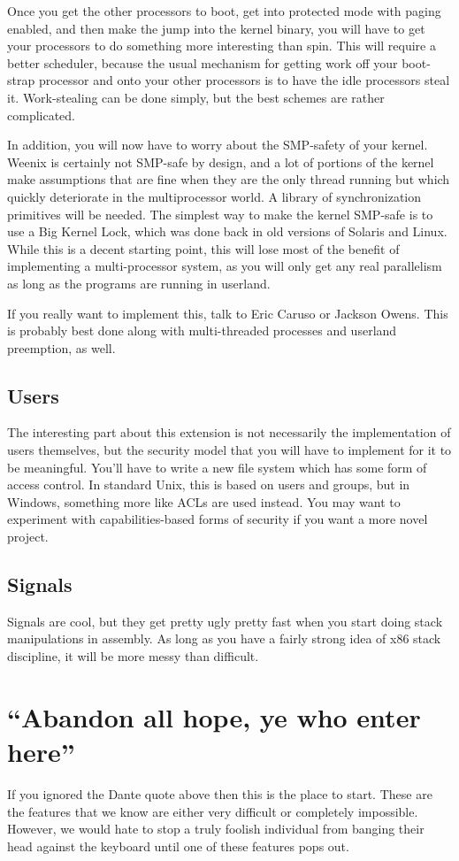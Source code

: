 Once you get the other processors to boot, get into protected mode with paging enabled, and then make the jump into the kernel binary, you will have to get your processors to do something more interesting than spin. This will require a better scheduler, because the usual mechanism for getting work off your boot-strap processor and onto your other processors is to have the idle processors steal it. Work-stealing can be done simply, but the best schemes are rather complicated.

In addition, you will now have to worry about the SMP-safety of your kernel. Weenix is certainly not SMP-safe by design, and a lot of portions of the kernel make assumptions that are fine when they are the only thread running but which quickly deteriorate in the multiprocessor world. A library of synchronization primitives will be needed. The simplest way to make the kernel SMP-safe is to use a Big Kernel Lock, which was done back in old versions of Solaris and Linux. While this is a decent starting point, this will lose most of the benefit of implementing a multi-processor system, as you will only get any real parallelism as long as the programs are running in userland.

If you really want to implement this, talk to Eric Caruso or Jackson Owens. This is probably best done along with multi-threaded processes and userland preemption, as well.
\subsection{Users}
The interesting part about this extension is not necessarily the implementation of users themselves, but the security model that you will have to implement for it to be meaningful. You'll have to write a new file system which has some form of access control. In standard Unix, this is based on users and groups, but in Windows, something more like ACLs are used instead. You may want to experiment with capabilities-based forms of security if you want a more novel project.
\subsection{Signals}
Signals are cool, but they get pretty ugly pretty fast when you start doing stack manipulations in assembly. As long as you have a fairly strong idea of x86 stack discipline, it will be more messy than difficult.

\section{``Abandon all hope, ye who enter here''}
If you ignored the Dante quote above then this is the place to start. These are the features that we know are either very difficult or completely impossible. However, we would hate to stop a truly foolish individual from banging their head against the keyboard until one of these features pops out.

